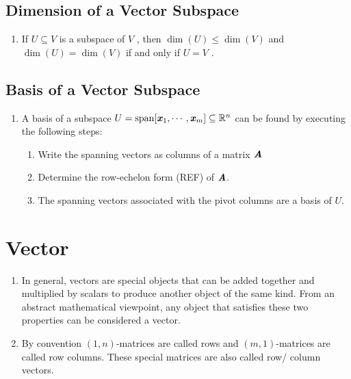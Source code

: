 \subsection{Dimension of a Vector Subspace}

\begin{enumerate}
    \item If $U \subseteq V$ is a subspace of $V$ , then $\dim(U) \leq \dim(V )$ and $\dim(U) = \dim(V )$ if and only if $U = V$ .
    \hfill \cite{mfml/book/mml/Deisenroth-Faisal-Ong}
\end{enumerate}



\subsection{Basis of a Vector Subspace}

\begin{enumerate}
    \item A basis of a subspace $U = \text{span}[\text{\textbf{\textit{x}}}_1, \cdots , \text{\textbf{\textit{x}}}_m] \subseteq \mathbb{R}^n$ can be found by executing the following steps:
    \hfill \cite{mfml/book/mml/Deisenroth-Faisal-Ong}
    \begin{enumerate}
        \item Write the spanning vectors as columns of a matrix $\text{\textbf{\textit{A}}}$
        \hfill \cite{mfml/book/mml/Deisenroth-Faisal-Ong}

        \item Determine the row-echelon form (REF) of $\text{\textbf{\textit{A}}}$.
        \hfill \cite{mfml/book/mml/Deisenroth-Faisal-Ong}

        \item The spanning vectors associated with the pivot columns are a basis of $U$.
        \hfill \cite{mfml/book/mml/Deisenroth-Faisal-Ong}
    \end{enumerate}
\end{enumerate}













\section{Vector}

\begin{enumerate}
    \item In general, vectors are special objects that can be added together and multiplied by scalars to produce another object of the same kind. From an abstract mathematical viewpoint, any object that satisfies these two properties can be considered a vector. 
    \hfill \cite{mfml/book/mml/Deisenroth-Faisal-Ong}

    \item By convention $(1, n)$-matrices are called rows and $(m, 1)$-matrices are called row columns. 
    These special matrices are also called row/ column vectors.
    \hfill \cite{mfml/book/mml/Deisenroth-Faisal-Ong}

    
\end{enumerate}


